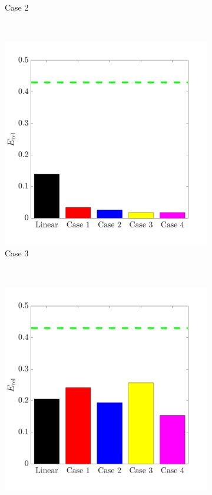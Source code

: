 \documentclass{jov}
\begin{document}
\begin{figure}
\begin{subfigure}{0.22 \textwidth}
	\caption{Case 2}
	\label{fig:case2Bar}
    \end{subfigure}
    ~ 
        \begin{subfigure}{0.22 \textwidth}
	\includegraphics[width=\textwidth]{../Figures/Figure14/Figure14_c.pdf}
	\caption{Case 3}
	\label{fig:case3Bar}
    \end{subfigure}
    ~ 
        \begin{subfigure}{0.22 \textwidth}
	\includegraphics[width=\textwidth]{../Figures/Figure14/Figure14_d.pdf}

\end{subfigure}
\end{figure}
\end{document}
